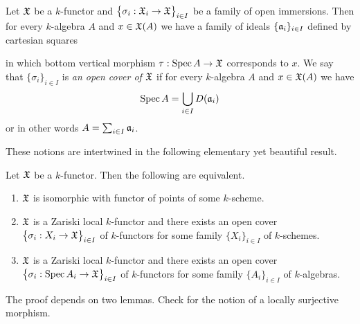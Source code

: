 \begin{definition}
Let ${\mathfrak X}$ be a $k$-functor and $\big\{\sigma_i:{\mathfrak X}_i\rightarrow {\mathfrak X}\big\}_{i\in I}$ be a family of open immersions. Then for every $k$-algebra $A$ and $x\in {\mathfrak X}(A)$ we have a family of ideals $\{\mathfrak{a}_i\}_{i\in I}$ defined by cartesian squares
\begin{center}
\end{center}
in which bottom vertical morphism $\tau:\mathrm{Spec}\, A \rightarrow {\mathfrak X}$ corresponds to $x$. We say that $\{\sigma_i\}_{i\in I}$ is \textit{an open cover of ${\mathfrak X}$} if for every $k$-algebra $A$ and $x\in {\mathfrak X}(A)$ we have
$$\mathrm{Spec}\, A = \bigcup_{i\in I}D(\mathfrak{a}_i)$$
or in other words $A = \sum_{i\in I}\mathfrak{a}_i$.
\end{definition}
\noindent
These notions are intertwined in the following elementary yet beautiful result.

\begin{theorem}\label{theorem:representability_basic_result}
Let ${\mathfrak X}$ be a $k$-functor. Then the following are equivalent.
\begin{enumerate}[label=\emph{\textbf{(\roman*)}}, leftmargin=3.0em]
\item ${\mathfrak X}$ is isomorphic with functor of points of some $k$-scheme.
\item ${\mathfrak X}$ is a Zariski local $k$-functor and there exists an open cover $\big\{\sigma_i:X_i \rightarrow {\mathfrak X}\big\}_{i\in I}$ of $k$-functors for some family $\{X_i\}_{i\in I}$ of $k$-schemes.
\item ${\mathfrak X}$ is a Zariski local $k$-functor and there exists an open cover $\big\{\sigma_i:\mathrm{Spec}\, A_i \rightarrow {\mathfrak X}\big\}_{i\in I}$ of $k$-functors for some family $\{A_i\}_{i\in I}$ of $k$-algebras.
\end{enumerate}
\end{theorem}
\noindent
The proof depends on two lemmas. Check {\cite[Definition 7.1]{Sheaves}} for the notion of a locally surjective morphism.

